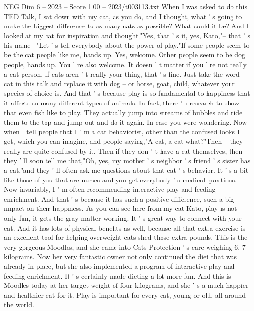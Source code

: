 \begin{textsample}{NEG Dim 6 – 2023 – Score 1.00 – 2023/t003113.txt}  \label{ex:f6_neg_008}
When I was asked to do this TED Talk, I sat down with my cat, as you do, and I thought, what ' s going to make the biggest difference to as many cats as possible?
What could it be?
And I looked at my cat for inspiration and thought,"Yes, that ' s it, yes, Kato,"-- that ' s his name --"Let ' s tell everybody about the power of play."If some people seem to be the cat people like me, hands up.
Yes, welcome.
Other people seem to be dog people, hands up.
You ' re also welcome.
It doesn ' t matter if you ' re not really a cat person.
If cats aren ' t really your thing, that ' s fine.
Just take the word cat in this talk and replace it with dog -- or horse, goat, child, whatever your species of choice is.
And that ' s because play is so fundamental to happiness that it affects so many different types of animals.
In fact, there ' s research to show that even fish like to play.
They actually jump into streams of bubbles and ride them to the top and jump out and do it again.
In case you were wondering.
Now when I tell people that I ' m a cat behaviorist, other than the confused looks I get, which you can imagine, and people saying,"A cat, a cat what?"Then -- they really are quite confused by it.
Then if they don ' t have a cat themselves, then they ' ll soon tell me that,"Oh, yes, my mother ' s neighbor ' s friend ' s sister has a cat,"and they ' ll often ask me questions about that cat ' s behavior.
It ' s a bit like those of you that are nurses and you get everybody ' s medical questions.
Now invariably, I ' m often recommending interactive play and feeding enrichment.
And that ' s because it has such a positive difference, such a big impact on their happiness.
As you can see here from my cat Kato, play is not only fun, it gets the gray matter working.
It ' s great way to connect with your cat.
And it has lots of physical benefits as well, because all that extra exercise is an excellent tool for helping overweight cats shed those extra pounds.
This is the very gorgeous Moodles, and she came into Cats Protection ' s care weighing 6. 7 kilograms.
Now her very fantastic owner not only continued the diet that was already in place, but she also implemented a program of interactive play and feeding enrichment.
It ' s certainly made dieting a lot more fun.
And this is Moodles today at her target weight of four kilograms, and she ' s a much happier and healthier cat for it.
Play is important for every cat, young or old, all around the world.

\end{textsample}
